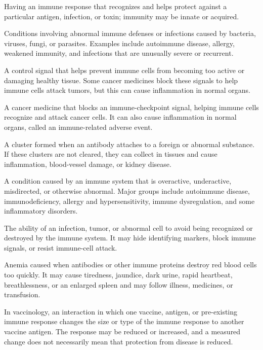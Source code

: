  Having an immune response that recognizes and helps protect against a particular antigen, infection, or toxin; immunity may be innate or acquired.

 Conditions involving abnormal immune defenses or infections caused by bacteria, viruses, fungi, or parasites. Examples include autoimmune disease, allergy, weakened immunity, and infections that are unusually severe or recurrent.

 A control signal that helps prevent immune cells from becoming too active or damaging healthy tissue. Some cancer medicines block these signals to help immune cells attack tumors, but this can cause inflammation in normal organs.

 A cancer medicine that blocks an immune-checkpoint signal, helping immune cells recognize and attack cancer cells. It can also cause inflammation in normal organs, called an immune-related adverse event.

 A cluster formed when an antibody attaches to a foreign or abnormal substance. If these clusters are not cleared, they can collect in tissues and cause inflammation, blood-vessel damage, or kidney disease.

 A condition caused by an immune system that is overactive, underactive, misdirected, or otherwise abnormal. Major groups include autoimmune disease, immunodeficiency, allergy and hypersensitivity, immune dysregulation, and some inflammatory disorders.

 The ability of an infection, tumor, or abnormal cell to avoid being recognized or destroyed by the immune system. It may hide identifying markers, block immune signals, or resist immune-cell attack.

 Anemia caused when antibodies or other immune proteins destroy red blood cells too quickly. It may cause tiredness, jaundice, dark urine, rapid heartbeat, breathlessness, or an enlarged spleen and may follow illness, medicines, or transfusion.

 In vaccinology, an interaction in which one vaccine, antigen, or pre-existing immune response changes the size or type of the immune response to another vaccine antigen. The response may be reduced or increased, and a measured change does not necessarily mean that protection from disease is reduced.


